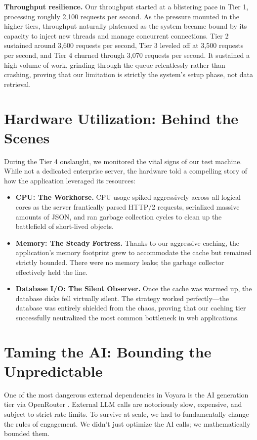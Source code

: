 \textbf{Throughput resilience.} Our throughput started at a blistering pace in Tier 1, processing roughly 2,100 requests per second. As the pressure mounted in the higher tiers, throughput naturally plateaued as the system became bound by its capacity to inject new threads and manage concurrent connections. Tier 2 sustained around 3,600 requests per second, Tier 3 leveled off at 3,500 requests per second, and Tier 4 churned through 3,070 requests per second. It sustained a high volume of work, grinding through the queue relentlessly rather than crashing, proving that our limitation is strictly the system's setup phase, not data retrieval.

\section{Hardware Utilization: Behind the Scenes}
During the Tier 4 onslaught, we monitored the vital signs of our test machine. While not a dedicated enterprise server, the hardware told a compelling story of how the application leveraged its resources:
\begin{itemize}
    \item \textbf{CPU: The Workhorse.} CPU usage spiked aggressively across all logical cores as the server frantically parsed HTTP/2 requests, serialized massive amounts of JSON, and ran garbage collection cycles to clean up the battlefield of short-lived objects.
    \item \textbf{Memory: The Steady Fortress.} Thanks to our aggressive caching, the application's memory footprint grew to accommodate the cache but remained strictly bounded. There were no memory leaks; the garbage collector effectively held the line.
    \item \textbf{Database I/O: The Silent Observer.} Once the cache was warmed up, the database disks fell virtually silent. The strategy worked perfectly—the database was entirely shielded from the chaos, proving that our caching tier successfully neutralized the most common bottleneck in web applications.
\end{itemize}

\section{Taming the AI: Bounding the Unpredictable}
One of the most dangerous external dependencies in Voyara is the AI generation tier via OpenRouter \cite{openrouter}. External LLM calls are notoriously slow, expensive, and subject to strict rate limits. To survive at scale, we had to fundamentally change the rules of engagement. We didn't just optimize the AI calls; we mathematically bounded them.

